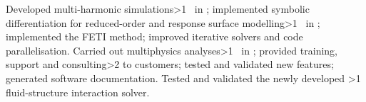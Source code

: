 \vbox{
{
    Developed multi-harmonic simulations\ifnum\value{npages}>1
        \ in \fi;
    implemented symbolic differentiation for reduced-order and response surface modelling\ifnum\value{npages}>1
        \ in \fi;
    implemented the FETI method;
    improved iterative solvers and code parallelisation.
}
{
    Carried out multiphysics analyses\ifnum\value{npages}>1
        \ in \fi;
        provided training, support and consulting\ifnum\value{npages}>2 to customers;
        tested and validated new features;
        generated software documentation\fi.
}
{
    Tested and validated the newly developed
    \ifnum\value{npages}>1
    \else
        fluid-structure interaction
    \fi
    solver.
}
}